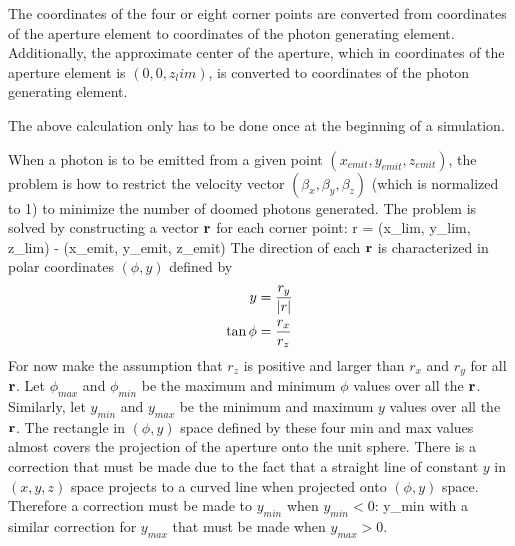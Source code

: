 The coordinates of the four or eight corner points are converted from  coordinates of
the aperture element to  coordinates of the photon generating element. Additionally, the
approximate center of the aperture, which in  coordinates of the aperture element is
$(0, 0, z_lim)$, is converted to  coordinates of the photon generating element.

The above calculation only has to be done once at the beginning of a simulation.

When a photon is to be emitted from a given point $(x_{emit}, y_{emit}, z_{emit})$, the problem is
how to restrict the velocity vector $(\beta_x, \beta_y, \beta_z)$ (which is normalized to 1) to
minimize the number of doomed photons generated. The problem is solved by constructing a vector ${\bf r}$ for each corner point:
\Begineq
  \Bf r = (x_{lim}, y_{lim}, z_{lim}) - (x_{emit}, y_{emit}, z_{emit})
\Endeq 
The direction of each ${\bf r}$ is characterized in polar coordinates $(\phi, y)$ defined by
\begin{align}
  y &= \frac{r_y}{|r|} \nonumber \\
  \tan\phi &= \frac{r_x}{r_z} 
\end{align}
For now make the assumption that $r_z$ is positive and larger than $r_x$ and $r_y$ for all ${\bf r}$.
Let $\phi_{max}$ and $\phi_{min}$ be the maximum and minimum $\phi$ values over all the ${\bf r}$. Similarly, let $y_{min}$ and $y_{max}$ be the minimum and maximum $y$ values over all the ${\bf r}$. The rectangle in $(\phi, y)$ space defined by these four min and max values almost covers the
projection of the aperture onto the unit sphere. There is a correction that must be made due to the
fact that a straight line of constant $y$ in $(x, y, z)$ space projects to a curved line when
projected onto $(\phi, y)$ space. Therefore a correction must be made to $y_{min}$ when $y_{min} <
0$:
\Begineq
  y_{min} \rightarrow 
\Endeq
with a similar correction for $y_{max}$ that must be made when $y_{max} > 0$.


